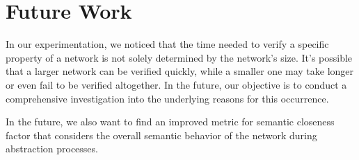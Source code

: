 \section{Future Work}
In our experimentation, we noticed that the time needed to verify a specific 
property of a network is not solely determined by the network's size. It's possible 
that a larger network can be verified quickly, while a smaller one may take longer 
or even fail to be verified altogether. In the future, our objective is to conduct a 
comprehensive investigation into the underlying reasons for this occurrence.

In the future, we also want to find an improved metric for semantic closeness factor
that considers the overall semantic behavior of the network during abstraction 
processes.









